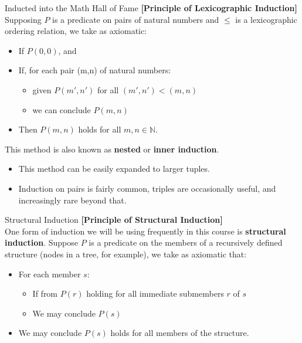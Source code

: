 \documentclass[11pt]{beamer}
\begin{document}
\begin{frame}[fragile=singleslide]{Inducted into the Math Hall of Fame}
\textbf{[Principle of Lexicographic Induction]}  \\
Supposing $P$ is a predicate on pairs of natural numbers and $\leq$ is a lexicographic ordering relation, we take as axiomatic:
\begin{itemize}
\item If $P(0,0)$, and 
\item If, for each pair (m,n) of natural numbers:
\begin{itemize}
\item given $P(m',n')$ for all $(m',n') < (m,n)$
\item we can conclude $P(m,n)$
\end{itemize}
\item Then $P(m,n)$ holds for all $m,n \in \mathbb{N}$.
\end{itemize}
This method is also known as \textbf{nested} or \textbf{inner induction}.  
\begin{itemize}
\item This method can be easily expanded to larger tuples.
\item Induction on pairs is fairly common, triples are occasionally useful, and increasingly rare beyond that.
\end{itemize}
\end{frame}

\begin{frame}[fragile=singleslide]{Structural Induction}
\textbf{[Principle of Structural Induction]} \\
One form of induction we will be using frequently in this course is \textbf{structural induction}.  Suppose $P$ is a predicate on the members of a recursively defined structure (nodes in a tree, for example), we take as axiomatic that:
\begin{itemize}
\item For each member $s$:
\begin{itemize}
\item If from $P(r)$ holding for all immediate submembers $r$ of $s$
\item We may conclude $P(s)$
\end{itemize}
\item We may conclude $P(s)$ holds for all members of the structure.  
\end{itemize}

\end{frame}
\end{document}
